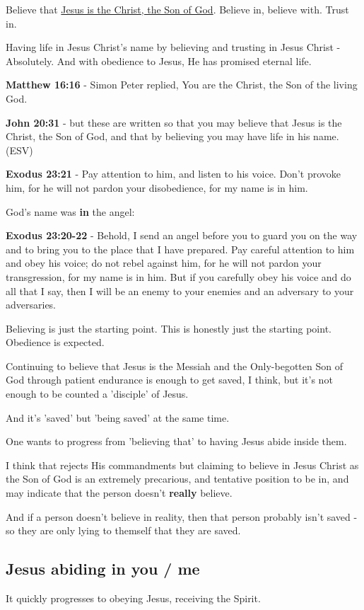 \documentclass[11pt]{article}
\begin{document}
Believe that \uline{Jesus is the Christ, the Son of God}. Believe in, believe with. Trust in.

Having life in Jesus Christ's name by believing and trusting in Jesus Christ - Absolutely.
And with obedience to Jesus, He has promised eternal life.

\textbf{Matthew 16:16} - Simon Peter replied, You are the Christ, the Son of the living God.

\textbf{John 20:31} - but these are written so that you may believe that Jesus is the Christ, the Son of God, and that by believing you may have life in his name. (ESV)

\textbf{Exodus 23:21} - Pay attention to him, and listen to his voice. Don't provoke him, for he will not pardon your disobedience, for my name is in him.

God's name was \textbf{in} the angel:

\textbf{Exodus 23:20-22} - Behold, I send an angel before you to guard you on the way and to bring you to the place that I have prepared. Pay careful attention to him and obey his voice; do not rebel against him, for he will not pardon your transgression, for my name is in him. But if you carefully obey his voice and do all that I say, then I will be an enemy to your enemies and an adversary to your adversaries.

Believing is just the starting point. This is honestly just the starting point. Obedience is expected.

Continuing to believe that Jesus is the Messiah and the Only-begotten Son of God through patient endurance is enough to get saved, I think, but it's not enough to be counted a 'disciple' of Jesus.

And it's 'saved' but 'being saved' at the same time.

One wants to progress from 'believing that' to having Jesus abide inside them.

I think that rejects His commandments but claiming to believe in Jesus Christ as the Son of God is an extremely precarious, and tentative position to be in,
and may indicate that the person doesn't \textbf{really} believe.

And if a person doesn't believe in reality, then that person probably isn't saved - so they are only lying to themself that they are saved.

\subsection{Jesus abiding in \textbf{you} / \textbf{me}}
\label{sec:orga3ab8d2}
It quickly progresses to obeying Jesus, receiving the Spirit.
\end{document}
